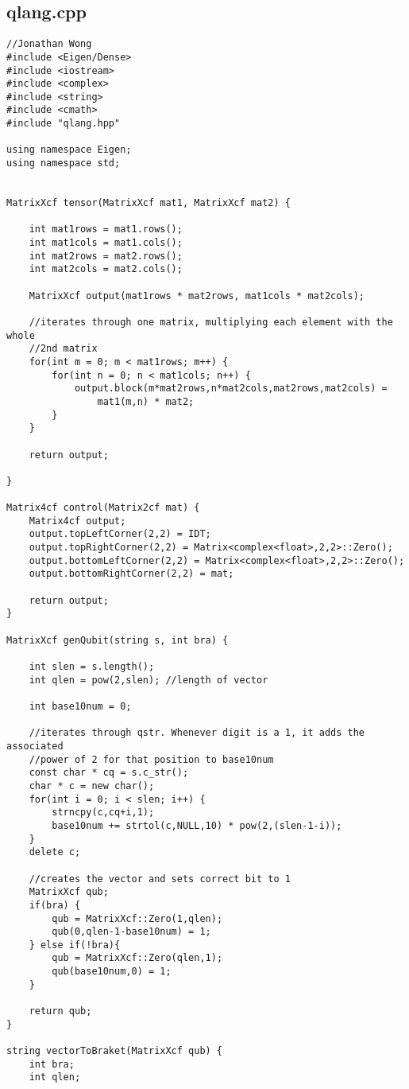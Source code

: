 \subsection{qlang.cpp}
\begin{lstlisting}
//Jonathan Wong
#include <Eigen/Dense>
#include <iostream>
#include <complex>
#include <string>
#include <cmath>
#include "qlang.hpp"

using namespace Eigen;
using namespace std;


MatrixXcf tensor(MatrixXcf mat1, MatrixXcf mat2) {

	int mat1rows = mat1.rows();
	int mat1cols = mat1.cols();
	int mat2rows = mat2.rows();
	int mat2cols = mat2.cols();

	MatrixXcf output(mat1rows * mat2rows, mat1cols * mat2cols);

	//iterates through one matrix, multiplying each element with the whole
	//2nd matrix
	for(int m = 0; m < mat1rows; m++) {
		for(int n = 0; n < mat1cols; n++) {
			output.block(m*mat2rows,n*mat2cols,mat2rows,mat2cols) = 
				mat1(m,n) * mat2;
		}
	}

	return output;
	
}

Matrix4cf control(Matrix2cf mat) {
	Matrix4cf output;
	output.topLeftCorner(2,2) = IDT;
	output.topRightCorner(2,2) = Matrix<complex<float>,2,2>::Zero();
	output.bottomLeftCorner(2,2) = Matrix<complex<float>,2,2>::Zero();
	output.bottomRightCorner(2,2) = mat;

	return output;
}

MatrixXcf genQubit(string s, int bra) {
	
	int slen = s.length();
	int qlen = pow(2,slen); //length of vector

	int base10num = 0;

	//iterates through qstr. Whenever digit is a 1, it adds the associated 
	//power of 2 for that position to base10num
	const char * cq = s.c_str();
	char * c = new char();
	for(int i = 0; i < slen; i++) {
		strncpy(c,cq+i,1);
		base10num += strtol(c,NULL,10) * pow(2,(slen-1-i));  
	}
	delete c;

	//creates the vector and sets correct bit to 1
	MatrixXcf qub;
	if(bra) {
		qub = MatrixXcf::Zero(1,qlen);
		qub(0,qlen-1-base10num) = 1;
	} else if(!bra){
		qub = MatrixXcf::Zero(qlen,1);
		qub(base10num,0) = 1;
	}

	return qub;
}

string vectorToBraket(MatrixXcf qub) {
	int bra;
	int qlen;


\end{lstlisting}
